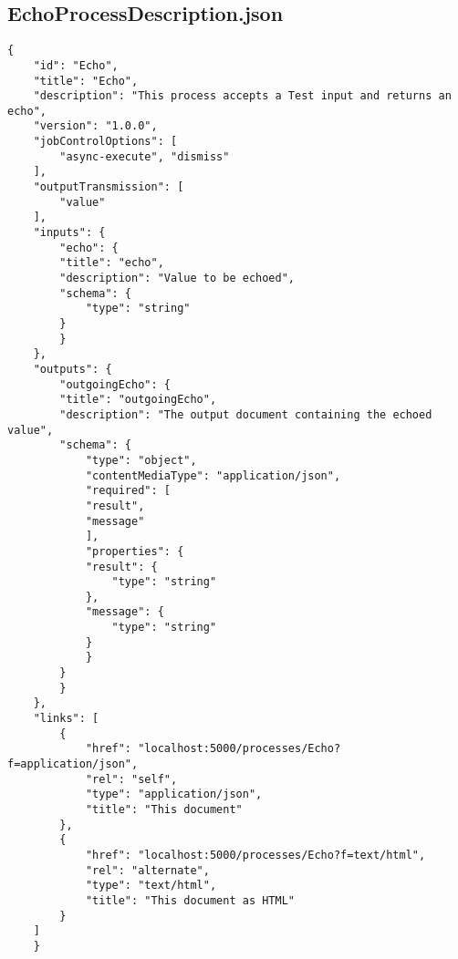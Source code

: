 \subsection{EchoProcessDescription.json}
\begin{lstlisting}[caption={EchoProcessDescription.json}, style = JSON]
{
    "id": "Echo",
    "title": "Echo",
    "description": "This process accepts a Test input and returns an echo",
    "version": "1.0.0",
    "jobControlOptions": [
        "async-execute", "dismiss"
    ],
    "outputTransmission": [
        "value"
    ],
    "inputs": {
        "echo": {
        "title": "echo",
        "description": "Value to be echoed",
        "schema": {
            "type": "string"
        }
        }
    },
    "outputs": {
        "outgoingEcho": {
        "title": "outgoingEcho",
        "description": "The output document containing the echoed value",
        "schema": {
            "type": "object",
            "contentMediaType": "application/json",
            "required": [
            "result",
            "message"
            ],
            "properties": {
            "result": {
                "type": "string"
            },
            "message": {
                "type": "string"
            }
            }
        }
        }
    },
    "links": [
        {
            "href": "localhost:5000/processes/Echo?f=application/json",
            "rel": "self",
            "type": "application/json",
            "title": "This document"
        },
        {
            "href": "localhost:5000/processes/Echo?f=text/html",
            "rel": "alternate",
            "type": "text/html",
            "title": "This document as HTML"
        }
    ]
    }     
\end{lstlisting}\label{appendixEchoProcessDescriptionJSON}  
